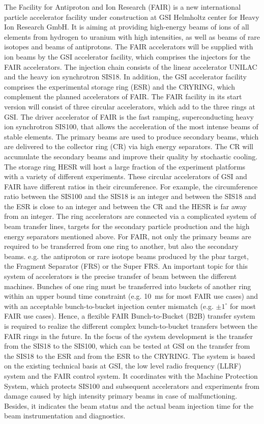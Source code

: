 The Facility for Antiproton and Ion Research (FAIR) is a new international particle accelerator facility under construction at GSI Helmholtz center for Heavy Ion Research GmbH. It is aiming at providing high-energy beams of ions of all elements from hydrogen to uranium with high intensities, as well as beams of rare isotopes and beams of antiprotons. The FAIR accelerators will be supplied with ion beams by the GSI accelerator facility, which comprises the injectors for the FAIR accelerators. The injection chain consists of the linear accelerator UNILAC and the heavy ion synchrotron SIS18. In addition, the GSI accelerator facility comprises the experimental storage ring (ESR) and the CRYRING, which complement the planned accelerators of FAIR. The FAIR facility in its start version will consist of three circular accelerators, which add to the three rings at GSI. The driver accelerator of FAIR is the fast ramping, superconducting heavy ion synchrotron SIS100, that allows the acceleration of the most intense beams of stable elements. The primary beams are used to produce secondary beams, which are delivered to the collector ring (CR) via high energy separators. The CR will accumulate the secondary beams and improve their quality by stochastic cooling. The storage ring HESR will host a large fraction of the experiment platforms with a variety of different experiments. These circular accelerators of GSI and FAIR have different ratios in their circumference. For example, the circumference ratio between the SIS100 and the SIS18 is an integer and between the SIS18 and the ESR is close to an integer and between the CR and the HESR is far away from an integer. The ring accelerators are connected via a complicated system of beam transfer lines, targets for the secondary particle production and the high energy separators mentioned above. For FAIR, not only the primary beams are required to be transferred from one ring to another, but also the secondary beams. e.g. the antiproton or rare isotope beams produced by the pbar target, the Fragment Separator (FRS) or the Super FRS. An important topic for this system of accelerators is the precise transfer of beam between the different machines. Bunches of one ring must be transferred into buckets of another ring within an upper bound time constraint (e.g. \SI{10}{\ms} for most FAIR use cases) and with an acceptable bunch-to-bucket injection center mismatch (e.g. $\pm1^\circ$ for most FAIR use cases). Hence, a flexible FAIR Bunch-to-Bucket (B2B) transfer system is required to realize the different complex bunch-to-bucket transfers between the FAIR rings in the future. In the focus of the system development is the transfer from the SIS18 to the SIS100, which can be tested at GSI on the transfer from the SIS18 to the ESR and from the ESR to the CRYRING. The system is based on the existing technical basis at GSI, the low level radio frequency (LLRF) system and the FAIR control system. It coordinates with the Machine Protection System, which protects SIS100 and subsequent accelerators and experiments from damage caused by high intensity primary beams in case of malfunctioning. Besides, it indicates the beam status and the actual beam injection time for the beam instrumentation and diagnostics. 

